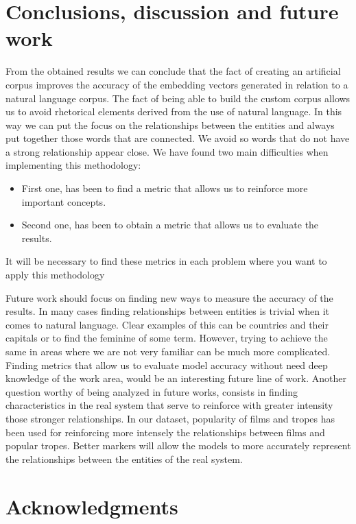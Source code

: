 \documentclass[letterpaper]{article}
\begin{document}
	
	
	\section{Conclusions, discussion and future work}
	 
	From the obtained results we can conclude that the fact of creating an artificial corpus improves the accuracy of the embedding vectors generated in relation to a natural language  corpus. The fact of being able to build the custom corpus allows us to avoid rhetorical elements derived from the use of natural language. In this way we can put the focus on the relationships between the entities and always put together those words that are connected. We avoid so words that do not have a strong relationship appear close. 
	We have found two main difficulties when implementing this methodology:
	\begin{itemize}
	\item First one, has been to find a metric that allows us to reinforce more important concepts. 
	\item Second one, has been to obtain a metric that allows us to evaluate the results.
    \end{itemize}
	It will be necessary to find these metrics in each problem where you want to apply this methodology
	
	Future work should focus on finding new ways to measure the accuracy of the results. In many cases finding relationships between entities is trivial when it comes to natural language. Clear examples of this can be countries and their capitals or to find the feminine of some term. However, trying to achieve the same in areas where we are not very familiar can be much more complicated. Finding metrics that allow us to evaluate model accuracy without need deep knowledge of the work area, would be an interesting future line of work. Another question worthy of being analyzed in future works, consists in finding characteristics in the real system that serve to reinforce with greater intensity those stronger relationships. In our dataset, popularity of films and tropes has been used for reinforcing more intensely the relationships between films and popular tropes. Better markers will allow the models to more accurately represent the relationships between the entities of the real system.
	
	
	
	\section{Acknowledgments}
	
	
	
	
\end{document}
